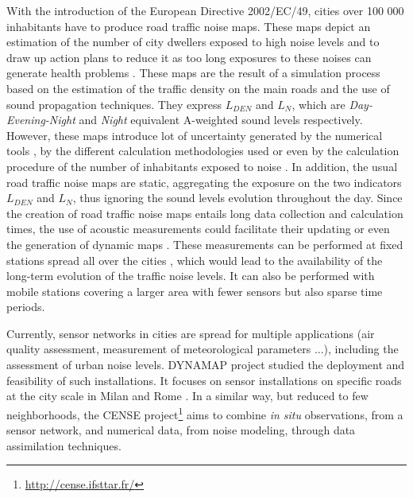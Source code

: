 \documentclass[twocolumn,a4paper,10pt]{article}
\begin{document}
With the introduction of the European Directive 2002/EC/49, cities over 100 000 inhabitants have to produce road traffic noise maps. These maps depict an estimation of the number of city dwellers exposed to high noise levels and to draw up action plans to reduce it as too long exposures to these noises can generate health problems \cite{who_burden_2017}. These maps are the result of a simulation process based on the estimation of the traffic density on the main roads and the use of sound propagation techniques. They express $L_ {DEN}$ and $L_N$, which are \textit{Day-Evening-Night} and \textit{Night} equivalent A-weighted sound levels respectively. However, these maps introduce lot of uncertainty generated by the numerical tools \cite{van_leeuwen_noise_2015}, by the different calculation methodologies used \cite{leroy_uncertainty_2010}\cite{garg_critical_2014} or even by the calculation procedure of the number of inhabitants exposed to noise \cite{king_implementation_2011}. In addition, the usual road traffic noise maps are static, aggregating the exposure on the two indicators $L_{DEN}$ and $L_N$, thus ignoring the sound levels evolution throughout the day. Since the creation of road traffic noise maps entails long data collection and calculation times, the use of acoustic measurements could facilitate their updating or even the generation of dynamic maps \cite{wei_dynamic_2016}. These measurements can be performed at fixed stations spread all over the cities \cite{Mioduszewski} \cite{mietlicki2012innovative}, which would lead to the availability of the long-term evolution of the traffic noise levels. It can also be performed with  mobile stations \cite{can_exploring_2012} \cite{manvell2004sadmam} covering a larger area with fewer sensors but also sparse time periods.

Currently, sensor networks in cities are spread for multiple applications (air quality assessment, measurement of meteorological parameters ...), including the assessment of urban noise levels. DYNAMAP project \cite{dynamap_2016} studied the deployment and feasibility of such installations. It focuses on sensor installations on specific roads at the city scale in Milan and Rome \cite{bellucci_life_2017}. In a similar way, but reduced to few neighborhoods, the CENSE project\footnote{\url{http://cense.ifsttar.fr/}} \cite{picaut2017characterization} aims to combine \textit{in situ} observations, from a sensor network, and numerical data, from noise modeling, through data assimilation techniques.
\end{document}
